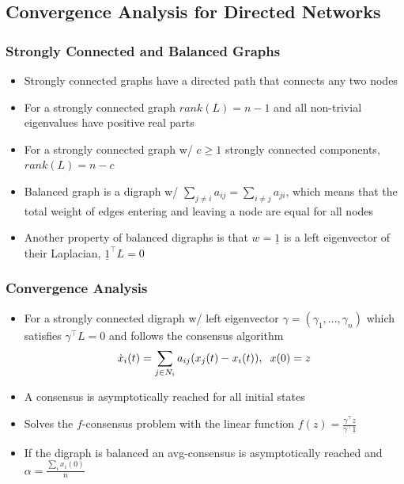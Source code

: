 \documentclass{beamer}
\begin{document}
\subsection{Convergence Analysis for Directed Networks}

\begin{frame}
\frametitle{Strongly Connected and Balanced Graphs}
\begin{itemize}
\item Strongly connected graphs have a directed path that connects any two nodes
\item For a strongly connected graph $rank(L)=n-1$ and all non-trivial eigenvalues have positive real parts
\item For a strongly connected graph w/ $c\geq 1$ strongly connected components, $rank(L)=n-c$
\item Balanced graph is a digraph w/ $\sum_{j\neq i}a_{ij}=\sum_{i\neq j}a_{ji}$, which means that the total weight of edges entering and leaving a node are equal for all nodes
\item Another property of balanced digraphs is that $w=\underline{1}$ is a left eigenvector of their Laplacian, $\underline{1} ^{\intercal}L=0$
\end{itemize}
\end{frame}


\begin{frame}
\frametitle{Convergence Analysis}
\begin{itemize}
\item For a strongly connected digraph w/ left eigenvector $\gamma=(\gamma_1, ..., \gamma_n)$ which satisfies $\gamma^{\intercal}L=0$ and follows the consensus algorithm
\begin{equation*}
\dot{x}_i(t)=\sum_{j\in N_i}a_{ij}(x_j(t)-x_i(t)), \hspace{.2cm} x(0)=z
\end{equation*}
\item A consensus is asymptotically reached for all initial states
\item Solves the $f$-consensus problem with the linear function $f(z)=\frac{\gamma^{\intercal}z}{\gamma^{\intercal}\underline{1}}$
\item If the digraph is balanced an avg-consensus is asymptotically reached and $\alpha=\frac{\sum_ix_i(0)}{n}$
\end{itemize}
\end{frame}
\end{document}
